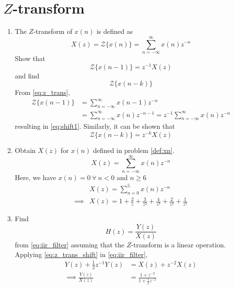 \documentclass[journal,12pt,twocolumn]{IEEEtran}
\renewcommand\thesection{\arabic{section}}
\begin{document}
\section{$Z$-transform}
\begin{enumerate}[label=\thesection.\arabic*]
\item The $Z$-transform of $x(n)$ is defined as
%
\begin{equation}
\label{eq:z_trans}
X(z)={\mathcal {Z}}\{x(n)\}=\sum _{n=-\infty }^{\infty }x(n)z^{-n}
\end{equation}
%
Show that
\begin{equation}
\label{eq:shift1}
{\mathcal {Z}}\{x(n-1)\} = z^{-1}X(z)
\end{equation}
and find
\begin{equation}
	{\mathcal {Z}}\{x(n-k)\} 
\end{equation}
\solution From \eqref{eq:z_trans},
\begin{align}
{\mathcal {Z}}\{x(n-1)\} &=\sum _{n=-\infty }^{\infty }x(n-1)z^{-n}
\\
&=\sum _{n=-\infty }^{\infty }x(n)z^{-n-1} = z^{-1}\sum _{n=-\infty }^{\infty }x(n)z^{-n}
\end{align}
resulting in \eqref{eq:shift1}. Similarly, it can be shown that
%
\begin{equation}
\label{eq:z_trans_shift}
	{\mathcal {Z}}\{x(n-k)\} = z^{-k}X(z)
\end{equation}

\item Obtain $X(z)$ for $x(n)$ defined in problem 
	\ref{def:xn}.
\solution
\begin{equation}
    X(z) =\sum _{n=-\infty }^{\infty }x(n)z^{-n}
\end{equation}
Here, we have $x(n) = 0 \ \forall \ n<0$ and $n\geq6$
\begin{align}
    & X(z) =\sum _{n=0 }^5x(n)z^{-n} \\
    \implies & X(z) = 1 + \frac{2}{z} + \frac{3}{z^2} + \frac{4}{z^3} + \frac{2}{z^4} + \frac{1}{z^5} 
\end{align}

\item Find
%
\begin{equation}
H(z) = \frac{Y(z)}{X(z)}
\end{equation}
%
from  \eqref{eq:iir_filter} assuming that the $Z$-transform is a linear operation.
\\
\solution  Applying \eqref{eq:z_trans_shift} in \eqref{eq:iir_filter},
\begin{align}
Y(z) + \frac{1}{2}z^{-1}Y(z) &= X(z)+z^{-2}X(z)
\\
\implies \frac{Y(z)}{X(z)} &= \frac{1 + z^{-2}}{1 + \frac{1}{2}z^{-1}}
\label{eq:freq_resp}
\end{align}


\end{enumerate}
\end{document}
